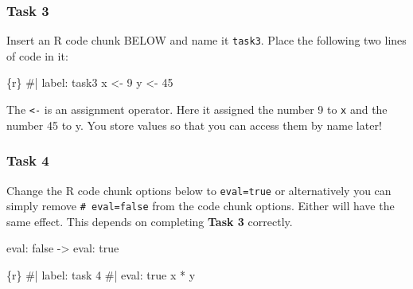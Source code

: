 \documentclass[
  letterpaper,
  DIV=11,
  numbers=noendperiod]{scrreprt}
\newenvironment{Shaded}{\begin{snugshade}}{\end{snugshade}}
\newcommand{\CommentTok}[1]{\textcolor[rgb]{0.37,0.37,0.37}{#1}}
\newcommand{\DecValTok}[1]{\textcolor[rgb]{0.68,0.00,0.00}{#1}}
\newcommand{\InformationTok}[1]{\textcolor[rgb]{0.37,0.37,0.37}{#1}}
\newcommand{\NormalTok}[1]{\textcolor[rgb]{0.00,0.23,0.31}{#1}}
\newcommand{\OtherTok}[1]{\textcolor[rgb]{0.00,0.23,0.31}{#1}}
\newcommand{\SpecialCharTok}[1]{\textcolor[rgb]{0.37,0.37,0.37}{#1}}
\begin{document}
\hypertarget{task-3}{%
\subsubsection*{Task 3}\label{task-3}}

Insert an R code chunk BELOW and name it \texttt{task3}. Place the
following two lines of code in it:

\begin{tcolorbox}[enhanced jigsaw, breakable, colback=white, bottomrule=.15mm, leftrule=.75mm, colframe=quarto-callout-important-color-frame, arc=.35mm, rightrule=.15mm, toprule=.15mm, left=2mm, opacityback=0]

\begin{Shaded}
\begin{Highlighting}[]
\InformationTok{\textasciigrave{}\textasciigrave{}\textasciigrave{}\{r\}}
\CommentTok{\#| label: task3}
\NormalTok{x }\OtherTok{\textless{}{-}} \DecValTok{9}
\NormalTok{y }\OtherTok{\textless{}{-}} \DecValTok{45}
\InformationTok{\textasciigrave{}\textasciigrave{}\textasciigrave{}}
\end{Highlighting}
\end{Shaded}

\end{tcolorbox}

The \texttt{\textless{}-} is an assignment operator. Here it assigned
the number 9 to \texttt{x} and the number 45 to y. You store values so
that you can access them by name later!

\hypertarget{task-4}{%
\subsubsection*{Task 4}\label{task-4}}

Change the R code chunk options below to \texttt{eval=true} or
alternatively you can simply remove \texttt{\#\textbar{}\ eval=false}
from the code chunk options. Either will have the same effect. This
depends on completing \textbf{Task 3} correctly.

\begin{tcolorbox}[enhanced jigsaw, breakable, colback=white, bottomrule=.15mm, leftrule=.75mm, colframe=quarto-callout-important-color-frame, arc=.35mm, rightrule=.15mm, toprule=.15mm, left=2mm, opacityback=0]
eval: false -\textgreater{} eval: true
\end{tcolorbox}

\begin{Shaded}
\begin{Highlighting}[]
\InformationTok{\textasciigrave{}\textasciigrave{}\textasciigrave{}\{r\}}
\CommentTok{\#| label: task 4}
\CommentTok{\#| eval: true}
\NormalTok{x }\SpecialCharTok{*}\NormalTok{ y}
\InformationTok{\textasciigrave{}\textasciigrave{}\textasciigrave{}}
\end{Highlighting}
\end{Shaded}
\end{document}
